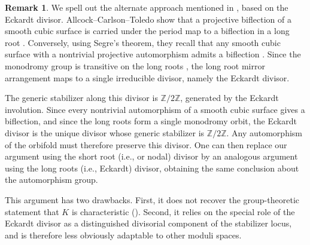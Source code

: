 \documentclass[11pt]{amsart}
\theoremstyle{plain}
\theoremstyle{definition}
\newtheorem{rem}[thm]{Remark}
\theoremstyle{remark}
\newcommand{\bbZ}{\mathbb{Z}}
\begin{document}
\begin{rem}\label{rmk1}
We spell out the alternate approach mentioned in , based on the Eckardt divisor. Allcock--Carlson--Toledo show that a projective biflection of a smooth cubic surface is carried under the period map to a biflection in a long root \cite[Lem.\ 11.4]{ACT}. Conversely, using Segre's theorem, they recall that any smooth cubic surface with a nontrivial projective automorphism admits a biflection \cite[(11.3), (11.12)]{ACT}. Since the monodromy group is transitive on the long roots \cite[Thm.\ 11.13]{ACT}, the long root mirror arrangement maps to a single irreducible divisor, namely the Eckardt divisor.

The generic stabilizer along this divisor is $\mathbb Z/2\mathbb Z$, generated by the Eckardt involution. Since every nontrivial automorphism of a smooth cubic surface gives a biflection, and since the long roots form a single monodromy orbit, the Eckardt divisor is the unique divisor whose generic stabilizer is $\bbZ/2\bbZ$. Any automorphism of the orbifold must therefore preserve this divisor. One can then replace our argument using the short root (i.e., or nodal) divisor by an analogous argument using the long roots (i.e., Eckardt) divisor, obtaining the same conclusion about the automorphism group.

This argument has two drawbacks. First, it does not recover the group-theoretic statement that $K$ is characteristic (). Second, it relies on the special role of the Eckardt divisor as a distinguished divisorial component of the stabilizer locus, and is therefore less obviously adaptable to other moduli spaces.
\end{rem}

{}

%

\end{document}

